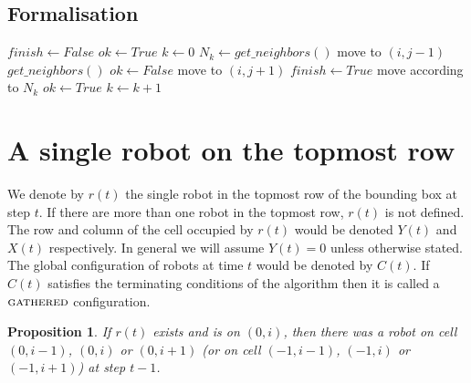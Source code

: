 \documentclass[11pt, a4paper]{article}
\theoremstyle{plain}
\newtheorem{prop}[thm]{Proposition}
\theoremstyle{definition}
\theoremstyle{remark}
\begin{document}
\subsection{Formalisation}
\begin{algorithm}[H]
  $finish \leftarrow False$\;
  $ok \leftarrow True$\;
  $k \leftarrow 0$\;
   {
    $N_k \leftarrow get\_neighbors()$\;
     {
       {
        move to $(i, j-1)$\;
        $get\_neighbors()$\;
         {
          $ok \leftarrow False$\;
        }
      }
    }
     {
       {
        move to $(i, j+1)$\;
      }
    }
     {
       {
          $finish \leftarrow True$\;
      }
       {
        move according to $N_k$\;
      }
      $ok \leftarrow True$\;
    }
    $k \leftarrow k+1$\;
  }
  \caption{}
\end{algorithm}

\newcommand{\Gathered}{\ensuremath{\textsc{gathered}}\xspace}

\section{A single robot on the topmost row}

We denote by $r(t)$ the single robot in the topmost row of the bounding box at
step $t$. If there are more than one robot in the topmost row, $r(t)$ is not
defined.  The row and column of the cell occupied by $r(t)$ would be denoted
$Y(t)$ and $X(t)$ respectively. In general we will assume $Y(t)=0$ unless
otherwise stated.  The global configuration of robots at time $t$ would be
denoted by $C(t)$. If $C(t)$ satisfies the terminating conditions of the
algorithm then it is called a \Gathered configuration.

\begin{prop}
If $r(t)$ exists and is on $(0,i)$, then there was a robot on cell $(0,i-1)$,
$(0,i)$ or $(0,i+1)$ (or on cell $(-1,i-1)$, $(-1,i)$ or $(-1,i+1)$) at step
$t-1$.
\end{prop}
\end{document}
